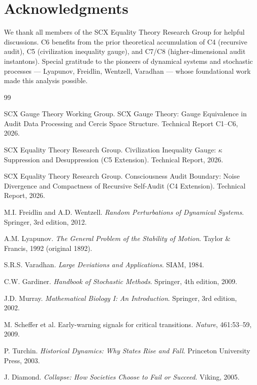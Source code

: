 \documentclass[12pt,a4paper]{article}
\theoremstyle{definition}
\newcommand{\SCX}{\textsf{SCX}}
\newcommand{\eqtheory}{Equality Theory}
\begin{document}
\section*{Acknowledgments}
\noindent
We thank all members of the \SCX{} \eqtheory{} Research Group for helpful discussions. C6 benefits from the prior theoretical accumulation of C4 (recursive audit), C5 (civilization inequality gauge), and C7/C8 (higher-dimensional audit instantons). Special gratitude to the pioneers of dynamical systems and stochastic processes --- Lyapunov, Freidlin, Wentzell, Varadhan --- whose foundational work made this analysis possible.

\begin{thebibliography}{99}

SCX Gauge Theory Working Group.
\newblock SCX Gauge Theory: Gauge Equivalence in Audit Data Processing and Cercis Space Structure.
\newblock Technical Report C1--C6, 2026.

SCX Equality Theory Research Group.
\newblock Civilization Inequality Gauge: $\kappa$ Suppression and Desuppression (C5 Extension).
\newblock Technical Report, 2026.

SCX Equality Theory Research Group.
\newblock Consciousness Audit Boundary: Noise Divergence and Compactness of Recursive Self-Audit (C4 Extension).
\newblock Technical Report, 2026.

M.I. Freidlin and A.D. Wentzell.
\newblock \textit{Random Perturbations of Dynamical Systems}.
\newblock Springer, 3rd edition, 2012.

A.M. Lyapunov.
\newblock \textit{The General Problem of the Stability of Motion}.
\newblock Taylor \& Francis, 1992 (original 1892).

S.R.S. Varadhan.
\newblock \textit{Large Deviations and Applications}.
\newblock SIAM, 1984.

C.W. Gardiner.
\newblock \textit{Handbook of Stochastic Methods}.
\newblock Springer, 4th edition, 2009.

J.D. Murray.
\newblock \textit{Mathematical Biology I: An Introduction}.
\newblock Springer, 3rd edition, 2002.

M. Scheffer et al.
\newblock Early-warning signals for critical transitions.
\newblock \textit{Nature}, 461:53--59, 2009.

P. Turchin.
\newblock \textit{Historical Dynamics: Why States Rise and Fall}.
\newblock Princeton University Press, 2003.

J. Diamond.
\newblock \textit{Collapse: How Societies Choose to Fail or Succeed}.
\newblock Viking, 2005.

\end{thebibliography}
\end{document}
